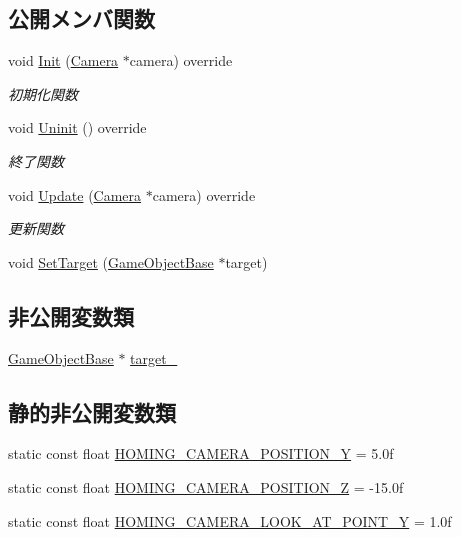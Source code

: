 \subsection*{公開メンバ関数}
\begin{DoxyCompactItemize}
\item 
void \mbox{\hyperlink{class_camera_state___homing_target_a9222190a5f26d564e99623b05941d382}{Init}} (\mbox{\hyperlink{class_camera}{Camera}} $\ast$camera) override
\begin{DoxyCompactList}\small\item\em 初期化関数 \end{DoxyCompactList}\item 
void \mbox{\hyperlink{class_camera_state___homing_target_ab2b5379b35ebafc53189bf4d45646c8c}{Uninit}} () override
\begin{DoxyCompactList}\small\item\em 終了関数 \end{DoxyCompactList}\item 
void \mbox{\hyperlink{class_camera_state___homing_target_a98f04985c06033febdad32d6357088c9}{Update}} (\mbox{\hyperlink{class_camera}{Camera}} $\ast$camera) override
\begin{DoxyCompactList}\small\item\em 更新関数 \end{DoxyCompactList}\item 
void \mbox{\hyperlink{class_camera_state___homing_target_a5beacf25aaff9547b5c4e32cec698e28}{Set\+Target}} (\mbox{\hyperlink{class_game_object_base}{Game\+Object\+Base}} $\ast$target)
\end{DoxyCompactItemize}
\subsection*{非公開変数類}
\begin{DoxyCompactItemize}
\item 
\mbox{\hyperlink{class_game_object_base}{Game\+Object\+Base}} $\ast$ \mbox{\hyperlink{class_camera_state___homing_target_a302d9fb35f1e46dab9a320287556c769}{target\+\_\+}}
\end{DoxyCompactItemize}
\subsection*{静的非公開変数類}
\begin{DoxyCompactItemize}
\item 
static const float \mbox{\hyperlink{class_camera_state___homing_target_a89dd98acec1474af5afb21d17fca4196}{H\+O\+M\+I\+N\+G\+\_\+\+C\+A\+M\+E\+R\+A\+\_\+\+P\+O\+S\+I\+T\+I\+O\+N\+\_\+Y}} = 5.\+0f
\item 
static const float \mbox{\hyperlink{class_camera_state___homing_target_ac858a396ea1e8ee84eed407321b3a140}{H\+O\+M\+I\+N\+G\+\_\+\+C\+A\+M\+E\+R\+A\+\_\+\+P\+O\+S\+I\+T\+I\+O\+N\+\_\+Z}} = -\/15.\+0f
\item 
static const float \mbox{\hyperlink{class_camera_state___homing_target_ab526a9a9aef20d87a1358ca8c4b4f075}{H\+O\+M\+I\+N\+G\+\_\+\+C\+A\+M\+E\+R\+A\+\_\+\+L\+O\+O\+K\+\_\+\+A\+T\+\_\+\+P\+O\+I\+N\+T\+\_\+Y}} = 1.\+0f
\end{DoxyCompactItemize}


